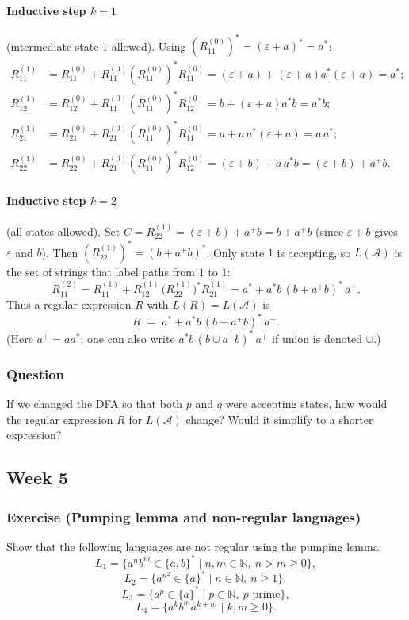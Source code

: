 \documentclass{article}
\theoremstyle{theorem}
\theoremstyle{definition}
\theoremstyle{remark}
\begin{document}
\paragraph{Inductive step $k=1$} (intermediate state 1 allowed). Using $(R^{(0)}_{11})^* = (\varepsilon+a)^* = a^*$:
\begin{align*}
R^{(1)}_{11} &= R^{(0)}_{11} + R^{(0)}_{11}(R^{(0)}_{11})^* R^{(0)}_{11} = (\varepsilon+a) + (\varepsilon+a)a^*(\varepsilon+a) = a^*; \\
R^{(1)}_{12} &= R^{(0)}_{12} + R^{(0)}_{11}(R^{(0)}_{11})^* R^{(0)}_{12} = b + (\varepsilon+a)a^* b = a^*b; \\
R^{(1)}_{21} &= R^{(0)}_{21} + R^{(0)}_{21}(R^{(0)}_{11})^* R^{(0)}_{11} = a + a\,a^*(\varepsilon+a) = a\,a^*; \\
R^{(1)}_{22} &= R^{(0)}_{22} + R^{(0)}_{21}(R^{(0)}_{11})^* R^{(0)}_{12} = (\varepsilon+b) + a\,a^* b = (\varepsilon+b) + a^+b.
\end{align*}

\paragraph{Inductive step $k=2$} (all states allowed). Set $C = R^{(1)}_{22} = (\varepsilon+b) + a^+b = b + a^+b$ (since $\varepsilon+b$ gives $\varepsilon$ and $b$). Then $(R^{(1)}_{22})^* = (b + a^+b)^*$. Only state $1$ is accepting, so $L(\mathcal{A})$ is the set of strings that label paths from $1$ to $1$:
\[
R^{(2)}_{11} = R^{(1)}_{11} + R^{(1)}_{12}\,\bigl(R^{(1)}_{22}\bigr)^* R^{(1)}_{21}
= a^* + a^*b\,(b+a^+b)^*\,a^+.
\]
Thus a regular expression $R$ with $L(R) = L(\mathcal{A})$ is
\[
\boxed{R \;=\; a^* + a^*b\,(b+a^+b)^*\,a^+}.
\]
(Here $a^+ = aa^*$; one can also write $a^*b\,(b \cup a^+b)^*\,a^+$ if union is denoted $\cup$.)

\subsubsection*{Question}
If we changed the DFA so that both $p$ and $q$ were accepting states, how would the regular expression $R$ for $L(\mathcal{A})$ change? Would it simplify to a shorter expression?

\subsection{Week 5}\label{sec:week5}

\subsubsection*{Exercise (Pumping lemma and non-regular languages)}
Show that the following languages are not regular using the pumping lemma:
\[
L_1 = \{ a^n b^m \in \{a,b\}^* \mid n,m \in \mathbb{N},\ n > m \ge 0 \},
\]
\[
L_2 = \{ a^{n^2} \in \{a\}^* \mid n \in \mathbb{N},\ n \ge 1 \},
\]
\[
L_3 = \{ a^p \in \{a\}^* \mid p \in \mathbb{N},\ p \text{ prime} \},
\]
\[
L_4 = \{ a^k b^m a^{k+m} \mid k,m \ge 0 \}.
\]
\end{document}
